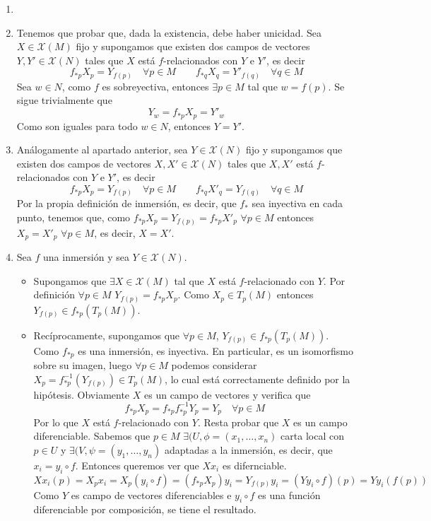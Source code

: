 \documentclass[twoside]{article}
\begin{document}
\begin{solucion}
\begin{enumerate}
\item[]
\item Tenemos que probar que, dada la existencia, debe haber unicidad. Sea $X\in\mathcal{X}(M)$ fijo y supongamos que existen dos campos de vectores $Y,Y'\in \mathcal{X}(N)$ tales que $X$ está $f$-relacionados con $Y$ e $Y'$, es decir
$$f_{\ast p}X_p = Y_{f(p)} \quad \forall p\in M \qquad
f_{\ast q}X_q = Y'_{f(q)} \quad \forall q\in M $$ 
Sea $w\in N$, como $f$ es sobreyectiva, entonces $\exists p \in M$ tal que $w=f(p)$. Se sigue trivialmente que
$$
Y_w = f_{\ast p}X_p = Y'_w
$$
Como son iguales para todo $w\in N$, entonces $Y=Y'$.
\item Análogamente al apartado anterior, sea $Y\in\mathcal{X}(N)$ fijo y supongamos que existen dos campos de vectores $X,X'\in \mathcal{X}(N)$ tales que $X,X'$ está $f$-relacionados con $Y$ e $Y'$, es decir
$$f_{\ast p}X_p = Y_{f(p)} \quad \forall p\in M \qquad
f_{\ast q}X'_q = Y_{f(q)} \quad \forall q\in M $$ 
Por la propia definición de inmersión, es decir, que $f_{\ast}$ sea inyectiva en cada punto, tenemos que, como $f_{\ast p}X_p = Y_{f(p)} = f_{\ast p}X'_p$ $\forall p\in M$ entonces $ X_p = X'_p$ $\forall p\in M$, es decir, $X=X'$.
\item Sea $f$ una inmersión y sea $Y \in \mathcal{X}(N)$.
\begin{itemize}
\item Supongamos que $\exists X \in \mathcal{X}(M)$ tal que $X$ está $f$-relacionado con $Y$. Por definición $\forall p\in M$ $Y_{f(p)}=f_{\ast p}X_p$. Como $X_p\in T_p(M)$ entonces ${Y_{f(p)}\in f_{\ast p}(T_p(M))}$.
\item Recíprocamente, supongamos que $\forall p \in M$, $Y_{f(p)}\in f_{\ast p}(T_p(M))$. Como $f_{\ast p}$ es una inmersión, es inyectiva. En particular, es un isomorfismo sobre su imagen, luego $\forall p\in M$ podemos considerar $X_p = f_{\ast p}^{-1}(Y_{f(p)})\in T_p(M)$, lo cual está correctamente definido por la hipótesis. Obviamente $X$ es un campo de vectores y verifica que
$$f_{\ast p} X_p = f_{\ast p} f_{\ast p}^{-1} Y_p = Y_p \quad \forall p \in M$$
Por lo que $X$ está $f$-relacionado con $Y$. Resta probar que $X$ es un campo diferenciable. Sabemos que $p\in M$ $\exists (U,\phi=(x_1,\dotsc,x_n)$ carta local con $p\in U$ y $\exists (V,\psi=(y_1,\dotsc,y_n)$ adaptadas a la inmersión, es decir, que $x_i = y_i \circ f$. Entonces queremos ver que $Xx_i$ es difernciable. 
$$Xx_i(p) = X_px_i= X_p(y_i \circ f) = (f_{\ast p}X_p) y_i = Y_{f(p)}y_i = (Y y_i \circ f)(p)=Yy_i(f(p))$$
Como $Y$ es campo de vectores diferenciables e $y_i \circ f$ es una función diferenciable por composición, se tiene el resultado.
\end{itemize} 
\end{enumerate}
\end{solucion}
\end{document}
